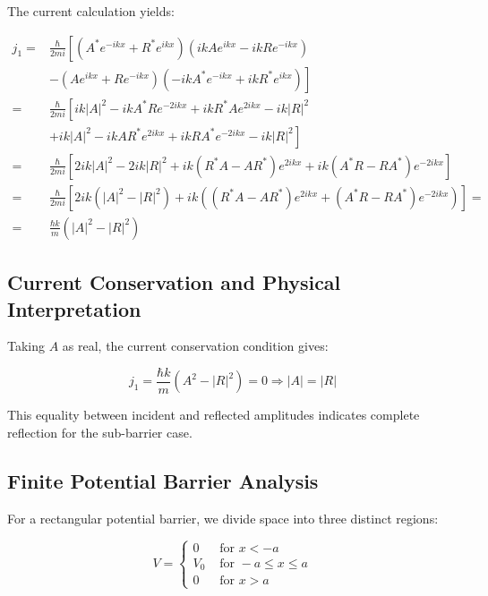 \documentclass[italian]{HKNdocument}
\begin{document}
The current calculation yields:

\begin{align}
j_{1}= & \frac{\hbar}{2 m i}\left[\left(A^{*} e^{-i k x}+R^{*} e^{i k x}\right)\left(i k A e^{i k x}-i k R e^{-i k x}\right)\right. \\
& \left.-\left(A e^{i k x}+R e^{-i k x}\right)\left(-i k A^{*} e^{-i k x}+i k R^{*} e^{i k x}\right)\right] \\
= & \frac{\hbar}{2 m i}\left[i k|A|^{2}-i k A^{*} R e^{-2 i k x}+i k R^{*} A e^{2 i k x}-i k|R|^{2}\right. \\
& \left.+i k|A|^{2}-i k A R^{*} e^{2 i k x}+i k R A^{*} e^{-2 i k x}-i k|R|^{2}\right] \\
= & \frac{\hbar}{2 m i}\left[2 i k|A|^{2}-2 i k|R|^{2}+i k\left(R^{*} A-A R^{*}\right) e^{2 i k x}+i k\left(A^{*} R-R A^{*}\right) e^{-2 i k x}\right] \\
= & \frac{\hbar}{2 m i}\left[2 i k\left(|A|^{2}-|R|^{2}\right)+i k\left(\left(R^{*} A-A R^{*}\right) e^{2 i k x}+\left(A^{*} R-R A^{*}\right) e^{-2 i k x}\right)\right]= \\
= & \frac{\hbar k}{m}\left(|A|^{2}-|R|^{2}\right)
\end{align}


\subsection{Current Conservation and Physical Interpretation}

Taking $A$ as real, the current conservation condition gives:

\begin{equation}
j_{1}=\frac{\hbar k}{m}\left(A^{2}-|R|^{2}\right)=0 \Longrightarrow|A|=|R|
\end{equation}

This equality between incident and reflected amplitudes indicates complete reflection for the sub-barrier case.

\subsection{Finite Potential Barrier Analysis}

For a rectangular potential barrier, we divide space into three distinct regions:

\[
V= \begin{cases}0 & \text { for } x<-a  \\ V_{0} & \text { for }-a \leq x \leq a \\ 0 & \text { for } x>a\end{cases}
\]
\end{document}

